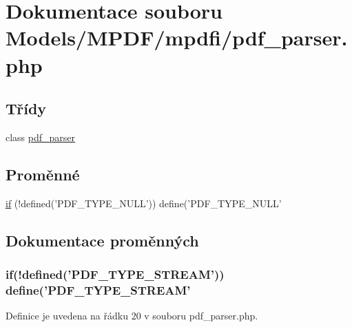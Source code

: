 \hypertarget{pdf__parser_8php}{\section{Dokumentace souboru Models/\-M\-P\-D\-F/mpdfi/pdf\-\_\-parser.php}
\label{pdf__parser_8php}
}
\subsection*{Třídy}
\begin{DoxyCompactItemize}
\item 
class \hyperlink{classpdf__parser}{pdf\-\_\-parser}
\end{DoxyCompactItemize}
\subsection*{Proměnné}
\begin{DoxyCompactItemize}
\item 
\hyperlink{pdf__parser_8php_af8105e84b42a9ceda5357caeb6c4760b}{if} (!defined('P\-D\-F\-\_\-\-T\-Y\-P\-E\-\_\-\-N\-U\-L\-L')) define('P\-D\-F\-\_\-\-T\-Y\-P\-E\-\_\-\-N\-U\-L\-L'
\end{DoxyCompactItemize}


\subsection{Dokumentace proměnných}
\hypertarget{pdf__parser_8php_af8105e84b42a9ceda5357caeb6c4760b}{
\subsubsection[{if}]{\setlength{\rightskip}{0pt plus 5cm}if(!defined('P\-D\-F\-\_\-\-T\-Y\-P\-E\-\_\-\-S\-T\-R\-E\-A\-M')) define('P\-D\-F\-\_\-\-T\-Y\-P\-E\-\_\-\-S\-T\-R\-E\-A\-M'}}\label{pdf__parser_8php_af8105e84b42a9ceda5357caeb6c4760b}


Definice je uvedena na řádku 20 v souboru pdf\-\_\-parser.\-php.

